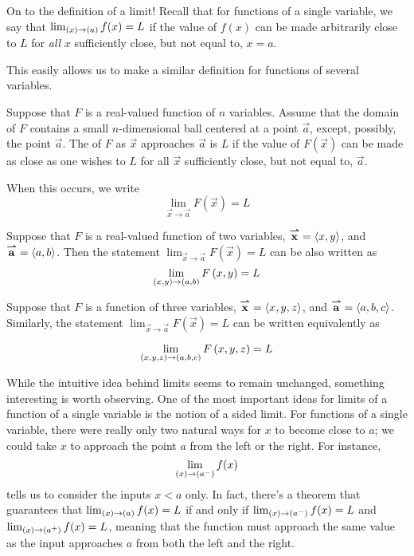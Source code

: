 \documentclass{ximera}
\begin{document}
On to the definition of a limit!
Recall that for functions of a single variable, we say that $\lim_{\left(x\right) \to \left(a\right)} f(x) = L$ if the value of $f(x)$ can be made arbitrarily close to $L$ for \emph{all} $x$ sufficiently close, but not equal to, $x=a$.

This easily allows us to make a similar definition for functions of several variables.

\begin{definition}
 Suppose that $F$ is a real-valued function of $n$ variables. Assume that the domain of $F$ contains a small $n$-dimensional ball centered at a point $\vec{a}$, except, possibly, the point $\vec{a}$.
  The  of $F$ as $\vec{x}$ approaches $\vec{a}$ is $L$ if the value of $F(\vec{x})$ can be made as close as one wishes to $L$ for all $\vec{x}$ sufficiently close, but not equal to, $\vec{a}$.
 
 When this occurs, we write 
 \[
 \lim_{\vec{x}\to \vec{a}} F(\vec{x}) = L
 \]  
\end{definition}

 \begin{remark}   
  Suppose that $F$ is a real-valued function of two variables, ${\overset{\boldsymbol{\rightharpoonup}}{\mathbf{x}}}\hspace{0in} = \left\langle x,y\right\rangle$, and ${\overset{\boldsymbol{\rightharpoonup}}{\mathbf{a}}}\hspace{0in} =
  \left\langle a,b\right\rangle$. 
  Then the statement $ \lim_{\vec{x}\to \vec{a}} F(\vec{x}) = L$ can be also written as
    \[
    \lim_{\left(x,y\right)\to \left(a,b\right) }F\left(x,y\right) = L
    \]
\end{remark}
  \begin{remark}
    Suppose that $F$ is a function of three variables, ${\overset{\boldsymbol{\rightharpoonup}}{\mathbf{x}}}\hspace{0in} = \left\langle x,y,z\right\rangle$, and
    ${\overset{\boldsymbol{\rightharpoonup}}{\mathbf{a}}}\hspace{0in} = \left\langle a,b,c\right\rangle$. Similarly, the statement 
    $ \lim_{\vec{x}\to \vec{a}} F(\vec{x}) = L$ can be written equivalently as

      \[
      \lim_{\left(x,y,z\right)\to \left(a,b,c\right)} F\left(x,y,z\right) = L
      \]


\end{remark}

While the intuitive idea behind limits seems to remain unchanged, something interesting is worth observing.  One of the most important ideas for limits of a function of a single variable is the notion of a sided limit.  For functions of a single variable, there were really only two natural ways for $x$ to become close to $a$; we could take $x$ to approach the point $a$ from the left or the right.  For instance,
\[
\lim_{\left(x\right) \to \left(a^-\right)}f(x) 
\]
tells us to consider the inputs $x<a$ only.  In fact, there's a theorem that guarantees that $\lim_{\left(x\right) \to \left(a\right)} f(x) = L$ if and only if $\lim_{\left(x\right) \to \left(a^-\right)}f(x) =L$ and $\lim_{\left(x\right) \to \left(a^+\right)}f(x) =L$, meaning that the function must approach the same value as the input approaches $a$ from both the left and the right.
\end{document}
